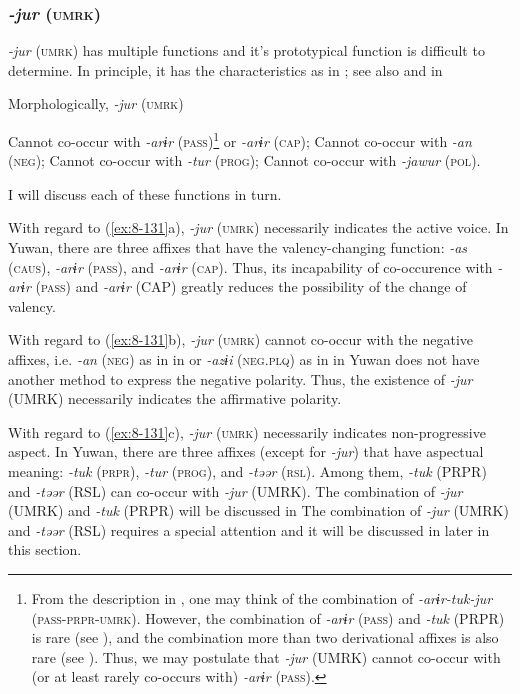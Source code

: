 \subsubsection{\textit{-jur} (\textsc{umrk})}

\textit{-jur} (\textsc{umrk}) has multiple functions and it’s prototypical function is difficult to determine. In principle, it has the characteristics as in ; see also  and  in 

\ea\label{ex:8-131}
  Morphologically, \textit{-jur} (\textsc{umrk})

\ea Cannot co-occur with \textit{-arɨr} (\textsc{pass})\footnote{From the description in , one may think of the combination of \textit{-arɨr-tuk-jur} (\textsc{pass}-\textsc{prpr}-\textsc{umrk}). However, the combination of \textit{-arɨr} (\textsc{pass}) and \textit{-tuk} (PRPR) is rare (see ), and the combination more than two derivational affixes is also rare (see ). Thus, we may postulate that \textit{-jur} (UMRK) cannot co-occur with (or at least rarely co-occurs with) \textit{-arɨr} (\textsc{pass}).} or \textit{-arɨr} (\textsc{cap});
\ex Cannot co-occur with \textit{-an} (\textsc{neg});
\ex Cannot co-occur with \textit{-tur} (\textsc{prog});
\ex Cannot co-occur with \textit{-jawur} (\textsc{pol}).
\z
\z

I will discuss each of these functions in turn.

With regard to (\ref{ex:8-131}a), \textit{-jur} (\textsc{umrk}) necessarily indicates the active voice. In Yuwan, there are three affixes that have the valency-changing function: \textit{-as} (\textsc{caus}), \textit{-arɨr} (\textsc{pass}), and \textit{-arɨr} (\textsc{cap}). Thus, its incapability of co-occurence with \textit{-arɨr} (\textsc{pass}) and \textit{-arɨr} (CAP) greatly reduces the possibility of the change of valency.

With regard to (\ref{ex:8-131}b), \textit{-jur} (\textsc{umrk}) cannot co-occur with the negative affixes, i.e. \textit{-an} (\textsc{neg}) as in  in  or \textit{-azɨi} (\textsc{neg}.\textsc{plq}) as in  in  Yuwan does not have another method to express the negative polarity. Thus, the existence of \textit{-jur} (UMRK) necessarily indicates the affirmative polarity.

  With regard to (\ref{ex:8-131}c), \textit{-jur} (\textsc{umrk}) necessarily indicates non-progressive aspect. In Yuwan, there are three affixes (except for \textit{-jur}) that have aspectual meaning: \textit{-tuk} (\textsc{prpr}), \textit{-tur} (\textsc{prog}), and \textit{-təər} (\textsc{rsl}). Among them, \textit{-tuk} (PRPR) and \textit{-təər} (RSL) can co-occur with \textit{-jur} (UMRK). The combination of \textit{-jur} (UMRK) and \textit{-tuk} (PRPR) will be discussed in  The combination of \textit{-jur} (UMRK) and \textit{-təər} (RSL) requires a special attention and it will be discussed in later in this section.

